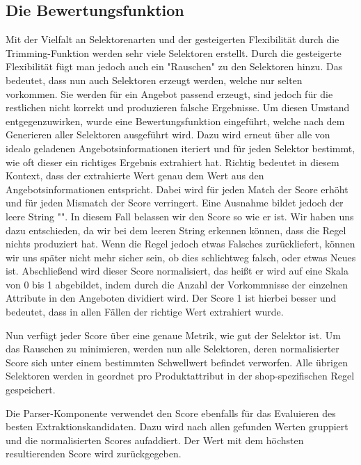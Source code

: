 \subsection{Die Bewertungsfunktion}
\label{subsec:bewertungsfunktion}

Mit der Vielfalt an Selektorenarten und der gesteigerten Flexibilität durch die Trimming-Funktion werden sehr viele
Selektoren erstellt.
Durch die gesteigerte Flexibilität fügt man jedoch auch ein "Rauschen" zu den Selektoren hinzu.
Das bedeutet, dass nun auch Selektoren erzeugt werden, welche nur selten vorkommen.
Sie werden für ein Angebot passend erzeugt, sind jedoch für die restlichen nicht korrekt und produzieren falsche
Ergebnisse.
Um diesen Umstand entgegenzuwirken, wurde eine Bewertungsfunktion eingeführt, welche nach dem Generieren aller
Selektoren ausgeführt wird.
Dazu wird erneut über alle von idealo geladenen Angebotsinformationen iteriert und für jeden Selektor bestimmt, wie
oft dieser ein richtiges Ergebnis extrahiert hat.
Richtig bedeutet in diesem Kontext, dass der extrahierte Wert genau dem Wert aus den Angebotsinformationen entspricht.
Dabei wird für jeden Match der Score erhöht und für jeden Mismatch der Score verringert.
Eine Ausnahme bildet jedoch der leere String "".
In diesem Fall belassen wir den Score so wie er ist.
Wir haben uns dazu entschieden, da wir bei dem leeren String erkennen können, dass die Regel nichts produziert hat.
Wenn die Regel jedoch etwas Falsches zurückliefert, können wir uns später nicht mehr sicher sein, ob dies schlichtweg
falsch, oder etwas Neues ist.
Abschließend wird dieser Score normalisiert, das heißt er wird auf eine Skala von 0 bis 1 abgebildet, indem durch die
Anzahl der Vorkommnisse der einzelnen Attribute in den Angeboten dividiert wird.
Der Score 1 ist hierbei besser und bedeutet, dass in allen Fällen der richtige Wert extrahiert wurde.

Nun verfügt jeder Score über eine genaue Metrik, wie gut der Selektor ist.
Um das Rauschen zu minimieren, werden nun alle Selektoren, deren normalisierter Score sich unter einem bestimmten
Schwellwert befindet verworfen.
Alle übrigen Selektoren werden in geordnet pro Produktattribut in der shop-spezifischen Regel gespeichert.

Die Parser-Komponente verwendet den Score ebenfalls für das Evaluieren des besten Extraktionskandidaten.
Dazu wird nach allen gefunden Werten gruppiert und die normalisierten Scores aufaddiert.
Der Wert mit dem höchsten resultierenden Score wird zurückgegeben.

\begin{comment}
    Implementierung: Um den nichtfunktionalen Anforderungen, insbesondere der Skalierbarkeit und Parallelität zu genügen, arbeitet die
    Parser-Komponente mit mehreren Threads und kann somit mehrere gecrawlte Seiten gleichzeitig verarbeiten.
    Zudem wurden Cache-Mechanismen verwendet, um die Anfragen an den SRG zu minimieren.
\end{comment}
